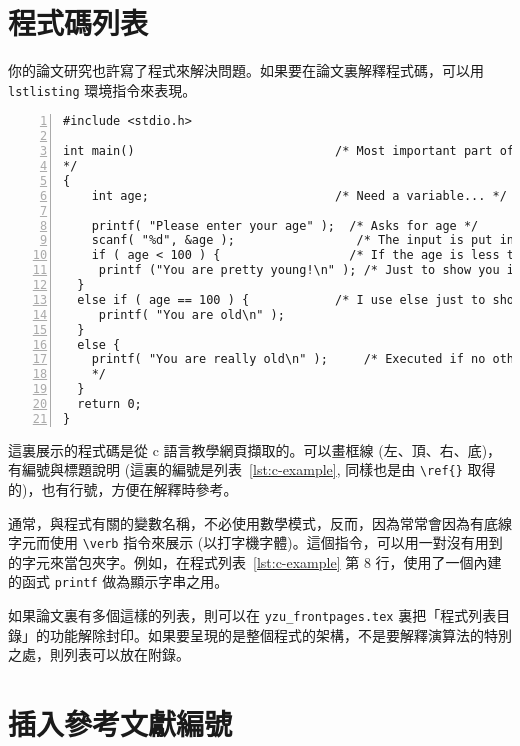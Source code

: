 \section{程式碼列表}
\label{sec:listing}
你的論文研究也許寫了程式來解決問題。如果要在論文裏解釋程式碼，可以用 \verb+lstlisting+ 環境指令來表現。

{\centering\begin{lstlisting}[caption={一段展示 if-else 用法的 c 程式碼},
label=lst:c-example,
numbers=left,
firstnumber=1,
frame=ltrb, % single lines for left, top, right, bottom; LTRB for double lines 
escapeinside={$$}, %如要在列表裡顯示特殊字元/排版效果，要把該文字串用 $$ 包夾住 (適合 C 程式碼)(原預設為 <>)
]
#include <stdio.h>	

int main()                            /* Most important part of the program!
*/
{
    int age;                          /* Need a variable... */
  
    printf( "Please enter your age" );  /* Asks for age */
    scanf( "%d", &age );                 /* The input is put in age */
    if ( age < 100 ) {                  /* If the age is less than 100 */
     printf ("You are pretty young!\n" ); /* Just to show you it works... */
  }
  else if ( age == 100 ) {            /* I use else just to show an example */ 
     printf( "You are old\n" );       
  }
  else {
    printf( "You are really old\n" );     /* Executed if no other statement is
    */
  }
  return 0;
}
\end{lstlisting}\par}

這裏展示的程式碼是從 c 語言教學網頁擷取的\cite{url_c_tutorial}。可以畫框線 (左、頂、右、底)，有編號與標題說明 (這裏的編號是列表~\ref{lst:c-example}, 同樣也是由 \verb+\ref{}+ 取得的)，也有行號，方便在解釋時參考。

通常，與程式有關的變數名稱，不必使用數學模式，反而，因為常常會因為有底線字元而使用 \verb+\verb+ 指令來展示 (以打字機字體)。這個指令，可以用一對沒有用到的字元來當包夾字。例如，在程式列表~\ref{lst:c-example} 第 8 行，使用了一個內建的函式 \verb|printf| 做為顯示字串之用。 

如果論文裏有多個這樣的列表，則可以在 \verb+yzu_frontpages.tex+ 裏把「程式列表目錄」的功能解除封印。如果要呈現的是整個程式的架構，不是要解釋演算法的特別之處，則列表可以放在附錄。

\section{插入參考文獻編號}
\label{sec:cite}

